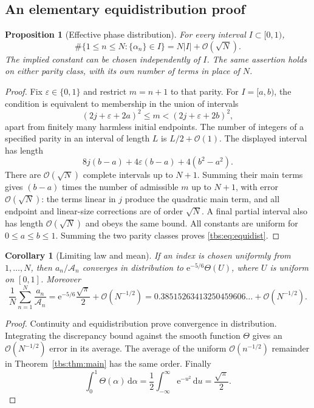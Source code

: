 \documentclass[11pt,a4paper]{article}
\numberwithin{equation}{section}
\newtheorem{proposition}[theorem]{Proposition}
\newtheorem{corollary}[theorem]{Corollary}
\theoremstyle{definition}
\newcommand{\Acal}{\mathcal A}
\newcommand{\eps}{\varepsilon}
\newcommand{\dd}{\,\mathrm d}
\newcommand{\ee}{\mathrm e}
\newcommand{\OO}{\mathcal O}
\begin{document}
\subsection{An elementary equidistribution proof}
\begin{proposition}[Effective phase distribution]\label{tbs:prop:equidist}
For every interval $I\subset[0,1)$,
\begin{equation}\label{tbs:eq:equidist}
 \#\{1\le n\le N:\{\alpha_n\}\in I\}
 =N|I|+\OO(\sqrt N).
\end{equation}
The implied constant can be chosen independently of $I$. The same
assertion holds on either parity class, with its own number of terms
in place of $N$.
\end{proposition}
\begin{proof}
Fix $\eps\in\{0,1\}$ and restrict $m=n+1$ to that parity. For
$I=[a,b)$, the condition is equivalent to membership in the union of
intervals
\[
 (2j+\eps+2a)^2\le m<(2j+\eps+2b)^2,
\]
apart from finitely many harmless initial endpoints. The number of
integers of a specified parity in an interval of length $L$ is
$L/2+\OO(1)$. The displayed interval has length
\[
 8j(b-a)+4\eps(b-a)+4(b^2-a^2).
\]
There are $\OO(\sqrt N)$ complete intervals up to $N+1$.
Summing their main terms gives $(b-a)$ times the number of admissible
$m$ up to $N+1$, with error $\OO(\sqrt N)$: the terms linear in $j$
produce the quadratic main term, and all endpoint and linear-size
corrections are of order $\sqrt N$. A final partial interval also has
length $\OO(\sqrt N)$ and obeys the same bound. All constants are
uniform for $0\le a\le b\le1$. Summing the two parity classes proves
\eqref{tbs:eq:equidist}.
\end{proof}

\begin{corollary}[Limiting law and mean]\label{tbs:cor:law}
If an index is chosen uniformly from $1,\ldots,N$, then
$a_n/\Acal_n$ converges in distribution to $\ee^{-5/6}\Theta(U)$,
where $U$ is uniform on $[0,1]$. Moreover
\begin{equation}\label{tbs:eq:mean}
 \frac1N\sum_{n=1}^N\frac{a_n}{\Acal_n}
 =\ee^{-5/6}\frac{\sqrt\pi}{2}+\OO(N^{-1/2})
 =0.38515263413250459606\ldots+\OO(N^{-1/2}).
\end{equation}
\end{corollary}
\begin{proof}
Continuity and equidistribution prove convergence in distribution.
Integrating the discrepancy bound against the smooth function
$\Theta$ gives an $\OO(N^{-1/2})$ error in its average. The average of
the uniform $\OO(n^{-1/2})$ remainder in Theorem~\ref{tbs:thm:main} has the
same order. Finally
\[
 \int_0^1\Theta(\alpha)\dd\alpha
 =\frac12\int_{-\infty}^{\infty}\ee^{-u^2}\dd u
 =\frac{\sqrt\pi}{2}.
\]
\end{proof}
\end{document}
